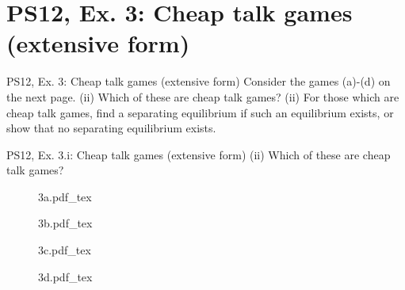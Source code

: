 \section{PS12, Ex. 3: Cheap talk games (extensive form)}

\begin{frame}{PS12, Ex. 3: Cheap talk games (extensive form)}
    Consider the games (a)-(d) on the next page. (ii) Which of these are cheap talk games? (ii) For those which are cheap talk games, find a separating equilibrium if such an equilibrium exists, or show that no separating equilibrium exists.
    \vfill\null
\end{frame}

\begin{frame}{PS12, Ex. 3.i: Cheap talk games (extensive form)}
    (ii) Which of these are cheap talk games?\vspace{-6pt}
    \begin{multicols}{2}
      \begin{figure}[!h]
        \center{}
        {3a.pdf_tex}
      \end{figure}\vspace{-6pt}
      \begin{figure}[!h]
        \center{}
        {3b.pdf_tex}
      \end{figure}
      \vfill\null\columnbreak
      \begin{figure}[!h]
        \center{}
        {3c.pdf_tex}
      \end{figure}\vspace{-6pt}
      \begin{figure}[!h]
        \center{}
        {3d.pdf_tex}
      \end{figure}
      \vfill\null
    \end{multicols}
\end{frame}
